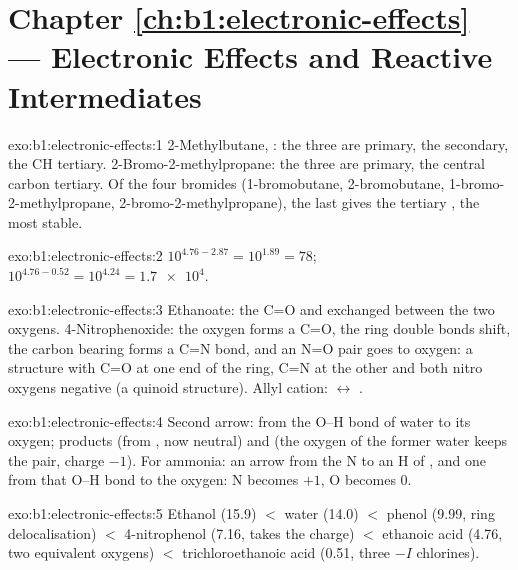 \section*{Chapter \ref{ch:b1:electronic-effects} --- Electronic Effects and Reactive Intermediates}

\begin{solution}{exo:b1:electronic-effects:1}
2-Methylbutane, : the three  are primary,
the  secondary, the CH tertiary. 2-Bromo-2-methylpropane: the three
 are primary, the central carbon tertiary. Of the four bromides
 (1-bromobutane, 2-bromobutane, 1-bromo-2-methylpropane,
2-bromo-2-methylpropane), the last gives the tertiary , the
most stable.
\end{solution}

\begin{solution}{exo:b1:electronic-effects:2}
$10^{4.76 - 2.87} = 10^{1.89} = 78$; $10^{4.76 - 0.52} = 10^{4.24} =
\num{1.7e4}$.
\end{solution}

\begin{solution}{exo:b1:electronic-effects:3}
Ethanoate: the C=O and  exchanged between the two oxygens.
4-Nitrophenoxide: the oxygen  forms a C=O, the ring double bonds
shift, the carbon bearing  forms a C=N bond, and an N=O pair goes
to oxygen: a structure with C=O at one end of the ring, C=N at the other
and both nitro oxygens negative (a quinoid structure). Allyl cation:
 $\leftrightarrow$ .
\end{solution}

\begin{solution}{exo:b1:electronic-effects:4}
Second arrow: from the O--H bond of water to its oxygen; products 
(from , now neutral) and  (the oxygen of the former water
keeps the pair, charge $-1$). For ammonia: an arrow from the N  to
an H of , and one from that O--H bond to the oxygen: N becomes
$+1$, O becomes 0.
\end{solution}

\begin{solution}{exo:b1:electronic-effects:5}
Ethanol (15.9) $<$ water (14.0) $<$ phenol (9.99, ring delocalisation) $<$
4-nitrophenol (7.16,  takes the charge) $<$ ethanoic acid (4.76,
two equivalent oxygens) $<$ trichloroethanoic acid (0.51, three $-I$
chlorines).
\end{solution}

